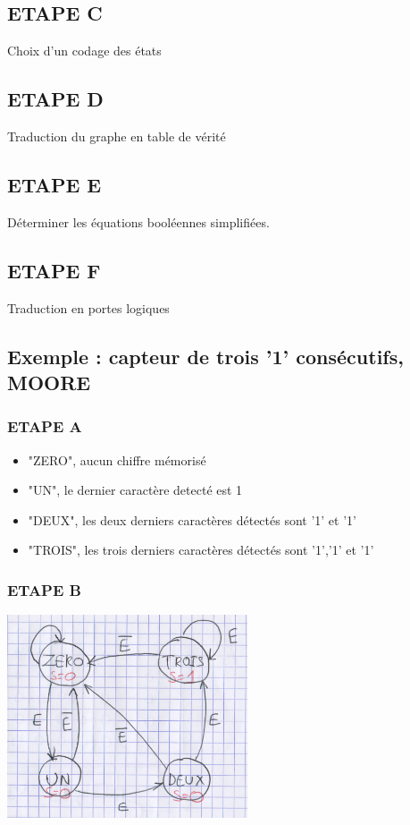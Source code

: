 \subsection{ETAPE C}
Choix d'un codage des états

\subsection{ETAPE D}
Traduction du graphe en table de vérité

\subsection{ETAPE E}
Déterminer les équations booléennes simplifiées.

\subsection{ETAPE F}
Traduction en portes logiques

\subsection{Exemple : capteur de trois '1' consécutifs, MOORE}

\subsubsection{ETAPE A}
\begin{itemize}
  \item "ZERO", aucun chiffre mémorisé
  \item "UN", le dernier caractère detecté est 1
  \item "DEUX", les deux derniers caractères détectés sont '1' et '1'
  \item "TROIS", les trois derniers caractères détectés sont '1','1' et '1'
\end{itemize}

\subsubsection{ETAPE B}
  \begin{center}
    \includegraphics[height=6cm]{cours1/pics/graph2.png}
  \end{center}

